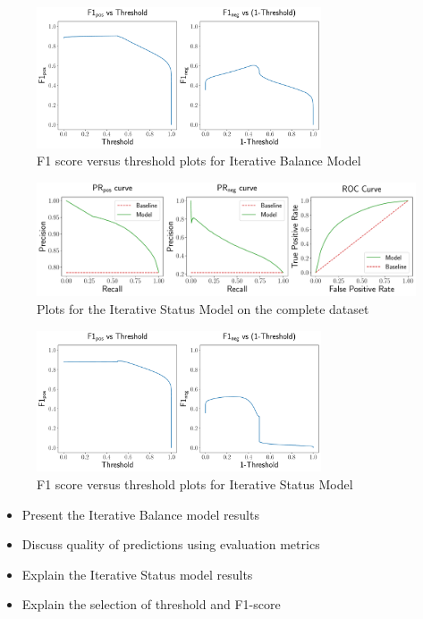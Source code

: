 \begin{figure}[htp]
    \centering
    \includegraphics[width=0.75\textwidth]{images/iterative_Balance_f1.pdf}
    \caption{F1 score versus threshold plots for Iterative Balance Model}
    \label{fig:complete-iterative-balance-f1}
\end{figure}


\begin{figure}[htp]
    \centering
    \includegraphics[width=\textwidth]{images/iterative_Status.pdf}
    \caption{Plots for the Iterative Status Model on the complete \wikirfa dataset}
    \label{fig:complete-iterative-status}
\end{figure}


\begin{figure}[htp]
    \centering
    \includegraphics[width=0.75\textwidth]{images/iterative_Status_f1.pdf}
    \caption{F1 score versus threshold plots for Iterative Status Model}
    \label{fig:complete-iterative-status-f1}
\end{figure}



\begin{itemize}
    \item Present the Iterative Balance model results
    \item Discuss quality of predictions using evaluation metrics
    \item Explain the Iterative Status model results 
    \item Explain the selection of threshold and F1-score
\end{itemize}

